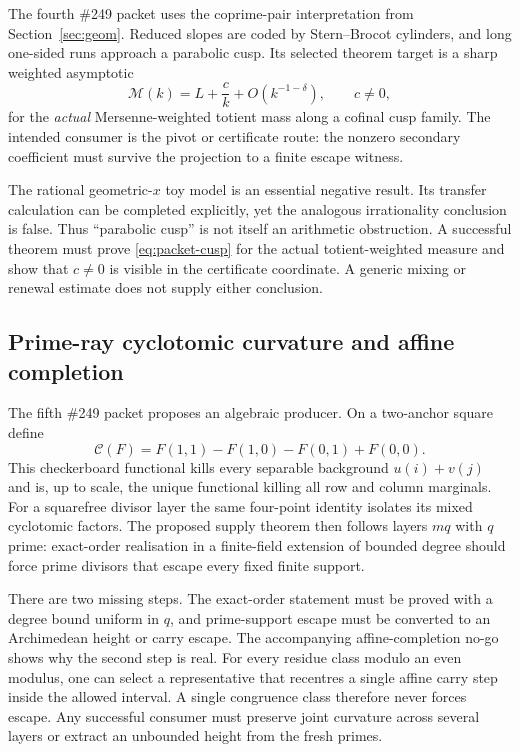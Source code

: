 \documentclass[11pt]{article}
\theoremstyle{definition}
\theoremstyle{remark}
\begin{document}
The fourth \#249 packet uses the coprime-pair interpretation from
Section~\ref{sec:geom}.  Reduced slopes are coded by Stern--Brocot cylinders,
and long one-sided runs approach a parabolic cusp.  Its selected theorem target
is a sharp weighted asymptotic
\[
 \mathcal M(k)=L+\frac{c}{k}+O(k^{-1-\delta}),
 \qquad c\ne0,
 \tag{C}\label{eq:packet-cusp}
\]
for the \emph{actual} Mersenne-weighted totient mass along a cofinal cusp
family.  The intended consumer is the pivot or certificate route: the nonzero
secondary coefficient must survive the projection to a finite escape witness.

The rational geometric-$x$ toy model is an essential negative result.  Its
transfer calculation can be completed explicitly, yet the analogous
irrationality conclusion is false.  Thus ``parabolic cusp'' is not itself an
arithmetic obstruction.  A successful theorem must prove
\eqref{eq:packet-cusp} for the actual totient-weighted measure and show that
$c\ne0$ is visible in the certificate coordinate.  A generic mixing or renewal
estimate does not supply either conclusion.

\subsection{Prime-ray cyclotomic curvature and affine completion}
\label{sec:packet-curvature}

The fifth \#249 packet proposes an algebraic producer.  On a two-anchor square
define
\[
 \mathcal C(F)=F(1,1)-F(1,0)-F(0,1)+F(0,0).
\]
This checkerboard functional kills every separable background $u(i)+v(j)$ and
is, up to scale, the unique functional killing all row and column marginals.
For a squarefree divisor layer the same four-point identity isolates its mixed
cyclotomic factors.  The proposed supply theorem then follows layers $m q$
with $q$ prime: exact-order realisation in a finite-field extension of bounded
degree should force prime divisors that escape every fixed finite support.

There are two missing steps.  The exact-order statement must be proved with a
degree bound uniform in $q$, and prime-support escape must be converted to an
Archimedean height or carry escape.  The accompanying affine-completion no-go
shows why the second step is real.  For every residue class modulo an even
modulus, one can select a representative that recentres a single affine carry
step inside the allowed interval.  A single congruence class therefore never
forces escape.  Any successful consumer must preserve joint curvature across
several layers or extract an unbounded height from the fresh primes.
\end{document}
